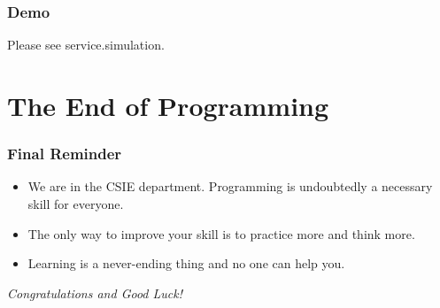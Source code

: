 \documentclass[11pt]{beamer}
\begin{document}
\begin{frame}
\frametitle{Demo}
Please see service.simulation.


\end{frame}

\section{The End of Programming}

\begin{frame}
\frametitle{Final Reminder}
\begin{itemize}
\item We are in the CSIE department. Programming is undoubtedly a necessary skill for everyone.
\item The only way to improve your skill is to {\color{red}practice more} and {\color{red}think more}.
\item Learning is a {\color{blue}never-ending} thing and no one can help you.
\end{itemize}
\end{frame}

\begin{frame}
\begin{center}
\Large \it \color{purple}
Congratulations and Good Luck!
\end{center}
\end{frame}
\end{document}
